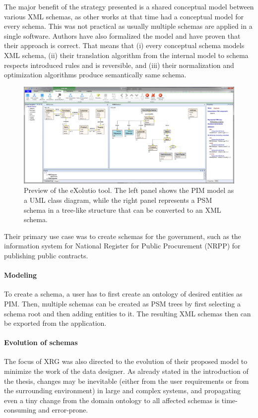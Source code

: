 The major benefit of the strategy presented is a shared conceptual model between various XML schemas, as other works at that time had a conceptual model for every schema. This was not practical as usually multiple schemas are applied in a single software. Authors have also formalized the model and have proven that their approach is correct. That means that (i) every conceptual schema models XML schema, (ii) their translation algorithm from the internal model to schema respects introduced rules and is reversible, and (iii) their normalization and optimization algorithms produce semantically same schema.

\begin{figure}[h!]
    \centering
    \includegraphics[width=\textwidth]{img/exolutio.png}
    \caption{Preview of the eXolutio tool. The left panel shows the PIM model as a UML class diagram, while the right panel represents a PSM schema in a tree-like structure that can be converted to an XML schema.}
    \label{fig:exolutio}
\end{figure}

Their primary use case was to create schemas for the government, such as the information system for National Register for Public Procurement (NRPP) for publishing public contracts.

\paragraph{Modeling} To create a schema, a user has to first create an ontology of desired entities as PIM. Then, multiple schemas can be created as PSM trees by first selecting a schema root and then adding entities to it. The resulting XML schemas then can be exported from the application.

\paragraph{Evolution of schemas} The focus of XRG was also directed to the evolution \cite{nevcasky2012evolution} of their proposed model to minimize the work of the data designer. As already stated in the introduction of the thesis, changes may be inevitable (either from the user requirements or from the surrounding environment) in large and complex systems, and propagating even a tiny change from the domain ontology to all affected schemas is time-consuming and error-prone.

